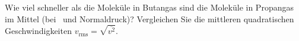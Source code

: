 Wie viel schneller als die Moleküle in Butangas sind die Moleküle in Propangas im Mittel (bei \thNO\ und Normaldruck)? Vergleichen Sie die mittleren quadratischen Geschwindigkeiten $v_\text{rms} = \sqrt{\overline{v^2}}$.

